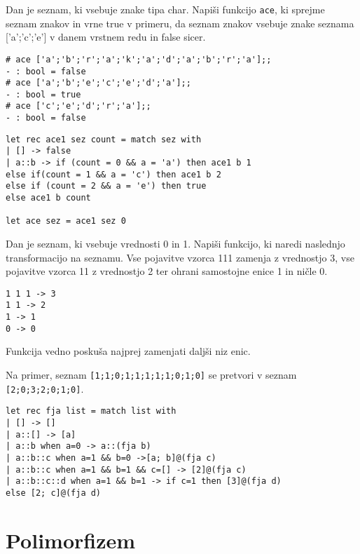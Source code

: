 \begin{ex}
Dan je seznam, ki vsebuje znake tipa char. Napi\v si funkcijo \texttt{ace}, ki sprejme seznam znakov in vrne true v primeru, da seznam znakov vsebuje znake seznama ['a';'c';'e'] v danem vrstnem redu in false sicer. 

\begin{verbatim}
# ace ['a';'b';'r';'a';'k';'a';'d';'a';'b';'r';'a'];;
- : bool = false
# ace ['a';'b';'e';'c';'e';'d';'a'];;
- : bool = true
# ace ['c';'e';'d';'r';'a'];;
- : bool = false
\end{verbatim}

\begin{sol}
\begin{verbatim}
let rec ace1 sez count = match sez with
| [] -> false
| a::b -> if (count = 0 && a = 'a') then ace1 b 1
else if(count = 1 && a = 'c') then ace1 b 2
else if (count = 2 && a = 'e') then true
else ace1 b count

let ace sez = ace1 sez 0
\end{verbatim}
\end{sol}

\end{ex}
\begin{ex}
Dan je seznam, ki vsebuje vrednosti 0 in 1. Napi\v si funkcijo, ki naredi naslednjo transformacijo na seznamu. Vse pojavitve vzorca 111 zamenja z vrednostjo 3, vse pojavitve vzorca 11 z vrednostjo 2 ter ohrani samostojne enice 1 in ni\v cle 0. 
\begin{verbatim}
1 1 1 -> 3
1 1 -> 2
1 -> 1
0 -> 0
\end{verbatim}

Funkcija vedno posku\v sa najprej zamenjati dalj\v si niz enic.

Na primer, seznam \texttt{[1;1;0;1;1;1;1;1;0;1;0]} se pretvori v seznam \texttt{[2;0;3;2;0;1;0]}.

\begin{sol}
\begin{verbatim}
let rec fja list = match list with
| [] -> []
| a::[] -> [a]
| a::b when a=0 -> a::(fja b)
| a::b::c when a=1 && b=0 ->[a; b]@(fja c)
| a::b::c when a=1 && b=1 && c=[] -> [2]@(fja c)
| a::b::c::d when a=1 && b=1 -> if c=1 then [3]@(fja d)
else [2; c]@(fja d)
\end{verbatim}
\end{sol}



\end{ex}

\section{Polimorfizem}

